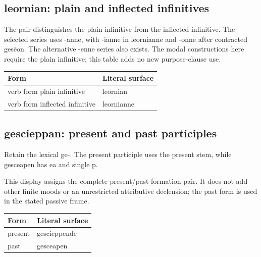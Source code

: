 \subsection*{leornian: plain and inflected infinitives}

The pair distinguishes the plain infinitive from the inflected infinitive. The selected series uses -anne, with -ianne in leornianne and -onne after contracted gesēon. The alternative -enne series also exists. The modal constructions here require the plain infinitive; this table adds no new purpose-clause use.

\par\begingroup
\fontsize{10.5}{13.2}\selectfont
\setlength{\LTleft}{0pt}\setlength{\LTright}{\fill}
\noindent
\begin{tabular}{@{}>{\raggedright\arraybackslash}p{73.68mm}>{\raggedright\arraybackslash}p{47.51mm}@{}}
\toprule
\textbf{Form} & \textbf{Literal surface} \\
\midrule
verb form plain infinitive & leornian \\
verb form inflected infinitive & leornianne \\
\bottomrule
\end{tabular}
\par\endgroup

\subsection*{gescieppan: present and past participles}

Retain the lexical ge-. The present participle uses the present stem, while gesceapen has ea and single p.

This display assigns the complete present/\allowbreak{}past formation pair. It does not add other finite moods or an unrestricted attributive declension; the past form is used in the stated passive frame.

\par\begingroup
\fontsize{10.5}{13.2}\selectfont
\setlength{\LTleft}{0pt}\setlength{\LTright}{\fill}
\noindent
\begin{tabular}{@{}>{\raggedright\arraybackslash}p{51.9mm}>{\raggedright\arraybackslash}p{69.29mm}@{}}
\toprule
\textbf{Form} & \textbf{Literal surface} \\
\midrule
present & gescieppende \\
past & gesceapen \\
\bottomrule
\end{tabular}
\par\endgroup


